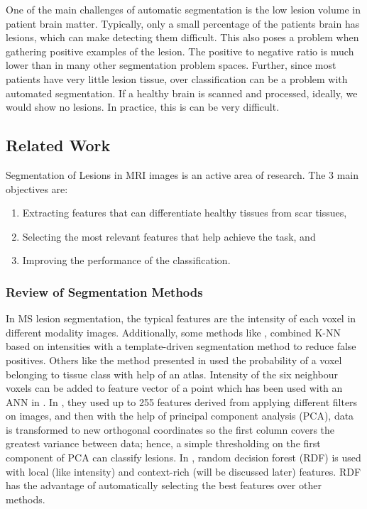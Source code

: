\documentclass{article} %
\begin{document}
One of the main challenges of automatic segmentation is the low lesion volume in patient brain matter. Typically, only a small percentage of the patients brain has lesions, which can make detecting them difficult. This also poses a problem when gathering positive examples of the lesion. The positive to negative ratio is much lower than in many other segmentation problem spaces. Further, since most patients have very little lesion tissue, over classification can be a problem with automated segmentation. If a healthy brain is scanned and processed, ideally, we would show no lesions. In practice, this is can be very difficult.


\subsection{Related Work}
Segmentation of Lesions in MRI images is an active area of research. The 3 main objectives are: 
\begin{enumerate}
  \item Extracting features that can differentiate healthy tissues from scar tissues, 
  \item Selecting the most relevant features that help achieve the task, and
  \item Improving the performance of the classification.
\end{enumerate} 

\subsubsection{Review of Segmentation Methods}
In MS lesion segmentation, the typical features are the intensity of each voxel in different modality images. Additionally, some methods like  \cite{commowick2009continuous}, combined K-NN based on intensities with a template-driven segmentation method to reduce false positives. Others like the method presented in \cite{zijdenbos2002automatic} used the probability of a voxel belonging to tissue class with help of an atlas. Intensity of the six neighbour voxels can be added to feature vector of a point which has been used with an ANN in \cite{younis2007ms}. In \cite{kroon2008multiple}, they used up to 255 features derived from applying different filters on images, and then with the help of principal component analysis (PCA), data is transformed to new orthogonal coordinates so the first column covers the greatest variance between data; hence, a simple thresholding on the first component of PCA can classify lesions. In \cite{geremia2011spatial}, random decision forest (RDF) is used with local (like intensity) and context-rich (will be discussed later) features. RDF has the advantage of automatically selecting the best features over other methods.
\end{document}
